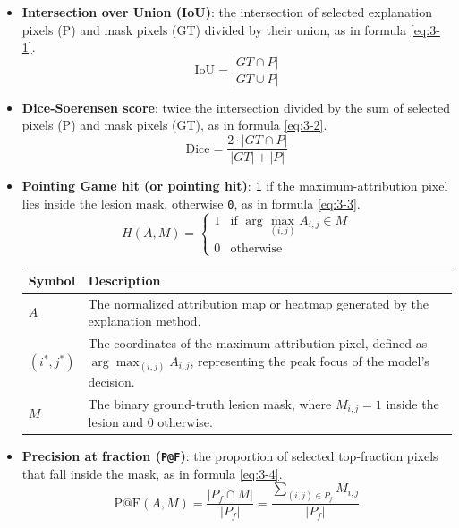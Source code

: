 \begin{itemize}
	\tightlist
	\item
	\textbf{Intersection over Union (IoU)}: the intersection of selected
	explanation pixels (P) and mask pixels (GT) divided by their union, as in formula \eqref{eq:3-1}.
	\begin{equation}
		\text{IoU} = \frac{|GT \cap P|}{|GT \cup P|}
		\label{eq:3-1}
	\end{equation}
	\item
	\textbf{Dice-Soerensen score}: twice the intersection divided by the sum of
	selected pixels (P) and mask pixels (GT), as in formula \eqref{eq:3-2}.
	\begin{equation}
		\text{Dice} = \frac{2 \cdot |GT \cap P|}{|GT| + |P|}
		\label{eq:3-2}
	\end{equation}
	\item
	\textbf{Pointing Game hit (or pointing hit)}: \texttt{1} if the maximum-attribution pixel
	lies inside the lesion mask, otherwise \texttt{0}, as in formula \eqref{eq:3-3}.
	\begin{equation}
		H(A, M) = \begin{cases} 
			1 & \text{if } \arg\max_{(i,j)} A_{i,j} \in M \\ 
			0 & \text{otherwise} 
		\end{cases}
		\label{eq:3-3}
	\end{equation}
	\begin{center}
		\small
		\begin{tabular}{lp{9cm}}
			\toprule
			\textbf{Symbol} & \textbf{Description} \\
			\midrule
			$A$ & The normalized attribution map or heatmap generated by the explanation method. \\
			$(i^*, j^*)$ & The coordinates of the maximum-attribution pixel, defined as $\arg\max_{(i,j)} A_{i,j}$, representing the peak focus of the model's decision. \\
			$M$ & The binary ground-truth lesion mask, where $M_{i,j} = 1$ inside the lesion and $0$ otherwise. \\
			\bottomrule
		\end{tabular}
	\end{center}
	\item
	\textbf{Precision at fraction (\texttt{P@F})}: the proportion of selected
	top-fraction pixels that fall inside the mask, as in formula \eqref{eq:3-4}.
	\begin{equation}
		\text{P@F}(A, M) = \frac{|P_f \cap M|}{|P_f|} = \frac{\sum_{(i,j) \in P_f} M_{i,j}}{|P_f|}

\end{equation}
\end{itemize}
